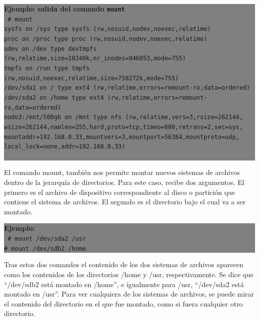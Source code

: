 \documentclass[12pt]{article}
\begin{document}
\colorbox{grey}{\parbox[t]{0.95\linewidth}{ \vspace*{0.5cm} { 
{\bf Ejemplo: salida del comando \texttt{mount}} \\ 
{\tt
\# mount\\ 
sysfs on /sys type sysfs (rw,nosuid,nodev,noexec,relatime)\\
proc on /proc type proc (rw,nosuid,nodev,noexec,relatime)\\
udev on /dev type devtmpfs (rw,relatime,size=10240k,nr\_inodes=946053,mode=755)\\
tmpfs on /run type tmpfs (rw,nosuid,noexec,relatime,size=758272k,mode=755)\\
/dev/sda1 on / type ext4 (rw,relatime,errors=remount-ro,data=ordered)\\
/dev/sda2 on /home type ext4 (rw,relatime,errors=remount-ro,data=ordered)\\
nodo3:/mnt/500gb on /mnt type nfs (rw,relatime,vers=3,rsize=262144,\\ 
wsize=262144,namlen=255,hard,proto=tcp,timeo=600,retrans=2,sec=sys,\\ 
mountaddr=192.168.0.33,mountvers=3,mountport=56384,mountproto=udp,\\
local\_lock=none,addr=192.168.0.33)\\
\\
}
} \vspace*{0.5cm} } } 

El comando mount, también nos permite montar nuevos sistemas de archivos 
dentro de la jerarquía de directorios. Para este caso, recibe dos 
argumentos. El primero es el archivo de 
dispositivo correspondiente al disco o partición que contiene el sistema 
de archivos. El segundo es el directorio bajo el cual va a ser montado. 

\colorbox{grey}{\parbox[t]{0.95\linewidth}{ \vspace*{0.5cm} { 
{\bf Ejemplo:} \\
{\tt
\# mount /dev/sda2 /usr\\
\# mount /dev/sdb2 /home\\ 
}
} \vspace*{0.5cm} } } 

Tras estos dos comandos el contenido de los dos sistemas de archivos 
aparecen como los contenidos de los directorios /home y /usr, 
respectivamente. Se dice que ``/dev/sdb2 está montado en /home'', e 
igualmente para /usr, ``/dev/sda2 está montado en /usr''. Para ver
cualquiera de los sistemas de archivos, se puede mirar el contenido del 
directorio en el que fue montado, como si fuera cualquier otro directorio.
\end{document}
